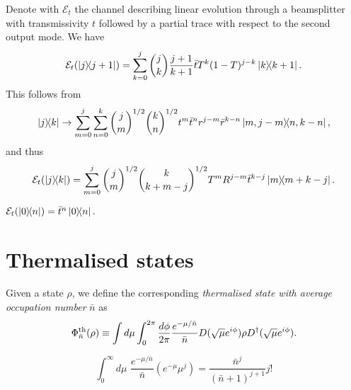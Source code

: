 \documentclass[12pt]{report}
\newcommand{\calE}{{\mathcal{E}}}
\begin{document}
\begin{example}
	Denote with $\calE_t$ the channel describing linear evolution through a beamsplitter with transmissivity $t$ followed by a partial trace with respect to the second output mode. We have
	\begin{equation}
		\calE_t(\ketbra{j}{j+1})
		= \sum_{k=0}^j \binom{j}{k} \frac{j+1}{k+1}
		\bar t T^k (1-T)^{j-k} \ketbra{k}{k+1}.
	\end{equation}
	This follows from
	\begin{equation}
		\ketbra{j}{k} \to
		\sum_{m=0}^j \sum_{n=0}^k
		\binom{j}{m}^{1/2} \binom{k}{n}^{1/2}
		t^{m} \bar t^n r^{j-m} \bar r^{k-n}
		\ketbra{m,j-m}{n,k-n},
	\end{equation}
	and thus
	\begin{equation}
		\calE_t(\ketbra{j}{k})
		= \sum_{m=0}^j \binom{j}{m}^{1/2} \binom{k}{k+m-j}^{1/2}
		T^m R^{j-m} \bar t^{k-j}
		\ketbra{m}{m+k-j}.
	\end{equation}
\end{example}

\begin{example}
		$\calE_t(\ketbra{0}{n})
				= \bar t^n \ketbra{0}{n}.$
\end{example}

\section{Thermalised states}

\begin{defn}
	Given a state $\rho$, we define the corresponding \emph{thermalised state with average occupation number} $\bar n$ as
	\begin{equation}
		\Phi_{\bar n}^{\rm th}(\rho)
		\equiv \int d\mu\int_0^{2\pi} \frac{d\phi}{2\pi} \frac{e^{-\mu/\bar n}}{\bar n}
		D(\sqrt\mu e^{i\phi})\rho D^\dagger(\sqrt\mu e^{i\phi}).
	\end{equation}
\end{defn}

\begin{prop}
	\begin{equation}
		\int_0^\infty d\mu \,\, \frac{e^{-\mu/\bar n}}{\bar n}
		(e^{-\mu}\mu^j)
		= \frac{\bar n^j}{(\bar n+1)^{j+1}} j!
	\end{equation}
\end{prop}
\end{document}
